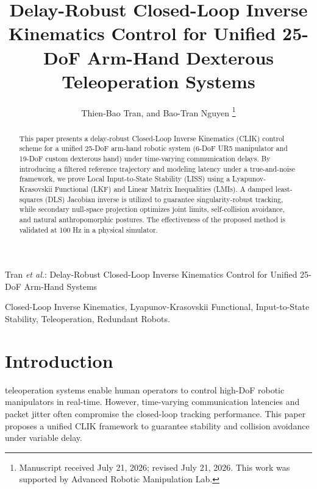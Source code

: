 \documentclass[letterpaper,journal]{IEEEtran}
\begin{document}
\title{Delay-Robust Closed-Loop Inverse Kinematics Control for Unified 25-DoF Arm-Hand Dexterous Teleoperation Systems}

\author{Thien-Bao Tran, and Bao-Tran Nguyen
\thanks{Manuscript received July 21, 2026; revised July 21, 2026. This work was supported by Advanced Robotic Manipulation Lab.}}

%
{Tran \MakeLowercase{\textit{et al.}}: Delay-Robust Closed-Loop Inverse Kinematics Control for Unified 25-DoF Arm-Hand Systems}

\maketitle

\begin{abstract}
This paper presents a delay-robust Closed-Loop Inverse Kinematics (CLIK) control scheme for a unified 25-DoF arm-hand robotic system (6-DoF UR5 manipulator and 19-DoF custom dexterous hand) under time-varying communication delays. By introducing a filtered reference trajectory and modeling latency under a true-and-noise framework, we prove Local Input-to-State Stability (LISS) using a Lyapunov-Krasovskii Functional (LKF) and Linear Matrix Inequalities (LMIs). A damped least-squares (DLS) Jacobian inverse is utilized to guarantee singularity-robust tracking, while secondary null-space projection optimizes joint limits, self-collision avoidance, and natural anthropomorphic postures. The effectiveness of the proposed method is validated at 100 Hz in a physical simulator.
\end{abstract}

\begin{IEEEkeywords}
Closed-Loop Inverse Kinematics, Lyapunov-Krasovskii Functional, Input-to-State Stability, Teleoperation, Redundant Robots.
\end{IEEEkeywords}

\section{Introduction}
 teleoperation systems enable human operators to control high-DoF robotic manipulators in real-time. However, time-varying communication latencies and packet jitter often compromise the closed-loop tracking performance. This paper proposes a unified CLIK framework to guarantee stability and collision avoidance under variable delay.
\end{document}

